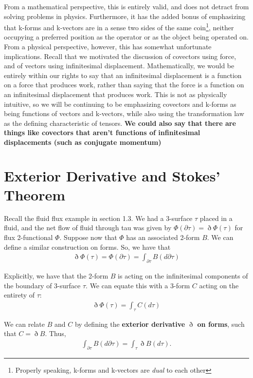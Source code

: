 \documentclass{book}
\begin{document}
From a mathematical perspective, this is entirely valid, and does not detract from solving problems in physics. Furthermore, it has the added bonus of emphasizing that k-forms and k-vectors are in a sense two sides of the same coin\footnote{Properly speaking, k-forms and k-vectors are \emph{dual} to each other}, neither occupying a preferred position as the operator or as the object being operated on. From a physical perspective, however, this has somewhat unfortunate implications. Recall that we motivated the discussion of covectors using force, and of vectors using infinitesimal displacement. Mathematically, we would be entirely within our rights to say that an infinitesimal displacement is a function on a force that produces work, rather than saying that the force is a function on an infinitesimal displacement that produces work. This is not as physically intuitive, so we will be continuing to be emphasizing covectors and k-forms as being functions of vectors and k-vectors, while also using the transformation law as the defining characteristic of tensors.
\textbf{ We could also say that there are things like covectors that aren't functions of infinitesimal displacements (such as conjugate momentum)}


\section{Exterior Derivative and Stokes' Theorem}


Recall the fluid flux example in section 1.3. We had a 3-surface $\tau$ placed in a fluid, and the net flow of fluid through tau was given by $\Phi(\partial\tau) = \eth\Phi(\tau)$ for flux 2-functional $\Phi$. Suppose now that $\Phi$ has an associated 2-form $B$. We can define a similar construction on forms. So, we have that \begin{gather} \eth\Phi(\tau) = \Phi(\partial\tau) = \int_{\partial\tau} B(d\partial\tau) \end{gather}

Explicitly, we have that the 2-form $B$ is acting on the infinitesimal components of the boundary of 3-surface $\tau$. We can equate this with a 3-form $C$ acting on the entirety of $\tau$: \begin{gather} \eth\Phi(\tau) = \int_\tau C(d\tau) \end{gather}

We can relate $B$ and $C$ by defining the \textbf{exterior derivative $\eth$ on forms}, such that $C = \eth B$. Thus, \begin{gather} \int_{\partial\tau} B(d\partial\tau) = \int_\tau \eth B(d\tau). \end{gather}
\end{document}
